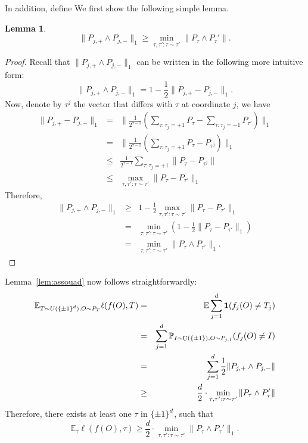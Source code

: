 \documentclass{article}
\newtheorem{lemma}{Lemma}
\newtheorem{definition}{Definition}
\DeclareMathOperator*{\U}{{\rm U}}
\newcommand{\EE}{\mathbb{E}}
\newcommand{\PP}{\mathbb{P}}
\newcommand{\Ocal}{\mathcal{O}}
\newcommand{\defeq}{\triangleq}
\newcommand*{\one}{{\bf 1}}
\begin{document}
In addition, define
We first show the following simple lemma.
\begin{lemma}
\[ \| P_{j,+} \wedge P_{j,-} \|_1 \geq \min_{\tau, \tau': \tau \sim \tau'} \| P_\tau \wedge P_\tau' \|. \]
\end{lemma}
\begin{proof}
Recall that $\| P_{j,+} \wedge P_{j,-} \|_1$ can be written in the following more intuitive form:
\[ \| P_{j,+} \wedge P_{j,-} \|_1 = 1 - \frac12 \| P_{j,+} - P_{j,-} \|_1. \]
Now, denote by $\tau^j$ the vector that differs with $\tau$ at coordinate $j$, we have
\begin{eqnarray*}
  \| P_{j,+} - P_{j,-} \|_1
   &=& \| \frac{1}{2^{\tau-1}} (\sum_{\tau: \tau_j = +1} P_{\tau} - \sum_{\tau: \tau_j = -1} P_{\tau'}) \|_1 \\
   &=& \| \frac{1}{2^{\tau-1}} (\sum_{\tau: \tau_j = +1} P_{\tau} - P_{\tau^j}) \|_1 \\
   &\leq& \frac{1}{2^{\tau-1}} \sum_{\tau: \tau_j = +1} \| P_{\tau} - P_{\tau^j} \| \\
   &\leq& \max_{\tau, \tau': \tau \sim \tau'} \| P_{\tau} - P_{\tau'} \|_1
\end{eqnarray*}
Therefore,
\begin{eqnarray*}
  \| P_{j,+} \wedge P_{j,-} \|_1
  &\geq& 1 - \frac12 \max_{\tau, \tau': \tau \sim \tau'} \| P_{\tau} - P_{\tau'} \|_1 \\
  &=& \min_{\tau, \tau': \tau \sim \tau'} (1 - \frac12 \| P_{\tau} - P_{\tau'} \|_1) \\
  &=& \min_{\tau, \tau': \tau \sim \tau'} \| P_\tau \wedge P_{\tau'} \|_1.
\end{eqnarray*}
\end{proof}

Lemma~\ref{lem:assouad} now follows straightforwardly:
\begin{eqnarray*}
  \EE_{T \sim U(\cbr{\pm 1}^d), O \sim P_T} \ell(f(O), T)
  &=& \EE \sum_{j=1}^d \one(f_j(O) \neq T_j) \\
  &=& \sum_{j=1}^d \PP_{I \sim \U(\cbr{\pm 1}), O \sim P_{j,I}}(f_j(O) \neq I) \\
  &=& \sum_{j=1}^d \frac12 \| P_{j,+} \wedge P_{j,-} \| \\
  &\geq& \frac{d}{2} \cdot \min_{\tau, \tau': \tau \sim \tau'} \| P_\tau \wedge P_\tau' \| \\
\end{eqnarray*}
Therefore, there exists at least one $\tau$ in $\cbr{\pm 1}^d$, such that
\[ \EE_{\tau} \ell(f(O), \tau) \geq \frac{d}{2} \cdot \min_{\tau, \tau': \tau \sim \tau'} \| P_\tau \wedge P_\tau' \|_1. \]




\end{document}

